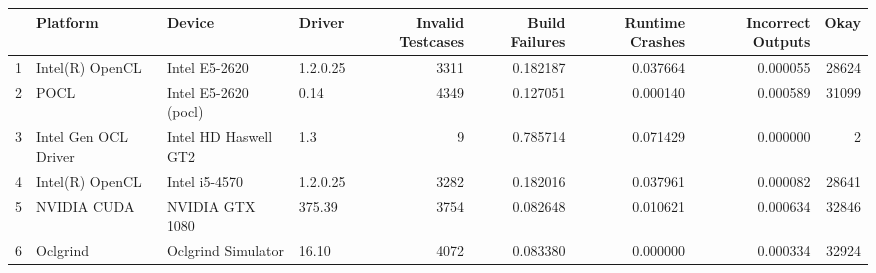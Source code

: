\begin{tabular}{llllrrrrr}
\toprule
{} &              Platform &                Device &    Driver &  Invalid Testcases &  Build Failures &  Runtime Crashes &  Incorrect Outputs &   Okay \\
\midrule
1 &       Intel(R) OpenCL &         Intel E5-2620 &  1.2.0.25 &               3311 &        0.182187 &         0.037664 &           0.000055 &  28624 \\
2 &                  POCL &  Intel E5-2620 (pocl) &      0.14 &               4349 &        0.127051 &         0.000140 &           0.000589 &  31099 \\
3 &  Intel Gen OCL Driver &  Intel HD Haswell GT2 &       1.3 &                  9 &        0.785714 &         0.071429 &           0.000000 &      2 \\
4 &       Intel(R) OpenCL &         Intel i5-4570 &  1.2.0.25 &               3282 &        0.182016 &         0.037961 &           0.000082 &  28641 \\
5 &           NVIDIA CUDA &       NVIDIA GTX 1080 &    375.39 &               3754 &        0.082648 &         0.010621 &           0.000634 &  32846 \\
6 &              Oclgrind &    Oclgrind Simulator &     16.10 &               4072 &        0.083380 &         0.000000 &           0.000334 &  32924 \\
\bottomrule
\end{tabular}
